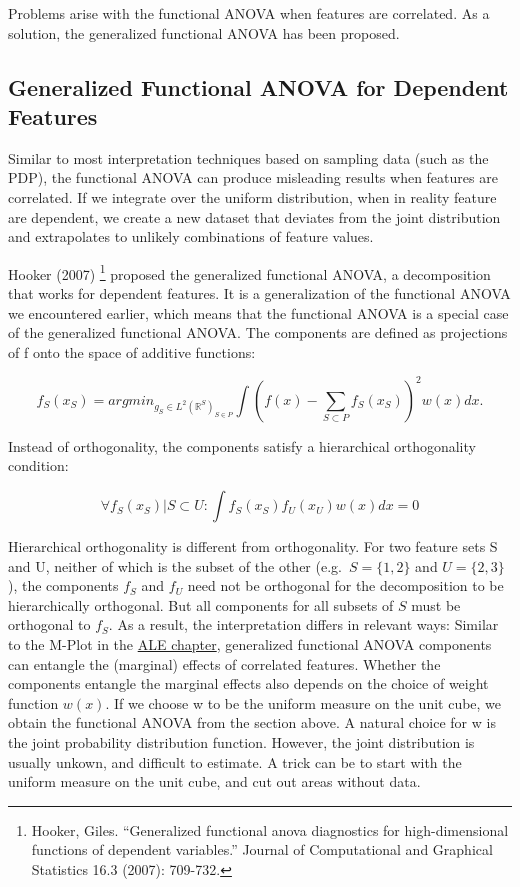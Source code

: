 \documentclass[
  12pt,
]{krantz}
\begin{document}
Problems arise with the functional ANOVA when features are correlated.
As a solution, the generalized functional ANOVA has been proposed.

\hypertarget{generalized-functional-anova-for-dependent-features}{%
\subsection{Generalized Functional ANOVA for Dependent Features}\label{generalized-functional-anova-for-dependent-features}}

Similar to most interpretation techniques based on sampling data (such as the PDP), the functional ANOVA can produce misleading results when features are correlated.
If we integrate over the uniform distribution, when in reality feature are dependent, we create a new dataset that deviates from the joint distribution and extrapolates to unlikely combinations of feature values.

Hooker (2007) \footnote{Hooker, Giles. ``Generalized functional anova diagnostics for high-dimensional functions of dependent variables.'' Journal of Computational and Graphical Statistics 16.3 (2007): 709-732.} proposed the generalized functional ANOVA, a decomposition that works for dependent features.
It is a generalization of the functional ANOVA we encountered earlier, which means that the functional ANOVA is a special case of the generalized functional ANOVA.
The components are defined as projections of f onto the space of additive functions:

\[f_S(x_S) = argmin_{g_S \in L^2(\mathbb{R}^S)_{S \in P}} \int \left(f(x)  - \sum_{S \subset P} f_S(x_S)\right)^2 w(x)dx.\]

Instead of orthogonality, the components satisfy a hierarchical orthogonality condition:

\[\forall f_S(x_S)| S \subset U: \int f_S(x_S) f_U(x_U) w(x)dx = 0\]

Hierarchical orthogonality is different from orthogonality.
For two feature sets S and U, neither of which is the subset of the other (e.g.~\(S=\{1,2\}\) and \(U=\{2,3\}\)), the components \(f_S\) and \(f_U\) need not be orthogonal for the decomposition to be hierarchically orthogonal.
But all components for all subsets of \(S\) must be orthogonal to \(f_S\).
As a result, the interpretation differs in relevant ways:
Similar to the M-Plot in the \protect\hyperlink{ale}{ALE chapter}, generalized functional ANOVA components can entangle the (marginal) effects of correlated features.
Whether the components entangle the marginal effects also depends on the choice of weight function \(w(x)\).
If we choose w to be the uniform measure on the unit cube, we obtain the functional ANOVA from the section above.
A natural choice for w is the joint probability distribution function.
However, the joint distribution is usually unkown, and difficult to estimate.
A trick can be to start with the uniform measure on the unit cube, and cut out areas without data.
\end{document}
